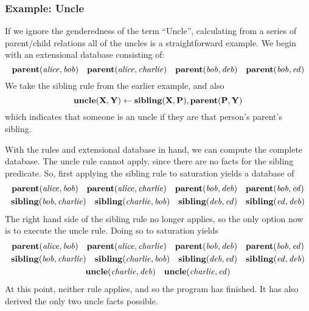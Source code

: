 \subsubsection{Example: Uncle}
If we ignore the genderedness of the term ``Uncle'', calculating from a series of parent/child relations all of the uncles is a straightforward example.
We begin with an extensional database consisting of:
\[
        {\bf parent}({\it alice}, {\it bob})
        \quad {\bf parent}({\it alice}, {\it charlie})
        \quad {\bf parent}({\it bob}, {\it deb})
        \quad {\bf parent}({\it bob}, {\it ed})
\]
We take the sibling rule from the earlier example, and also
\[
        {\bf uncle}({\bf X}, {\bf Y}) \leftarrow {\bf sibling}({\bf X}, {\bf P}), {\bf parent}({\bf P}, {\bf Y})
\]
which indicates that someone is an uncle if they are that person's parent's sibling.

With the rules and extensional database in hand, we can compute the complete database.
The uncle rule cannot apply, since there are no facts for the sibling predicate.
So, first applying the sibling rule to saturation yields a database of
\begin{gather*}
        {\bf parent}({\it alice}, {\it bob})
        \quad {\bf parent}({\it alice}, {\it charlie})
        \quad {\bf parent}({\it bob}, {\it deb})
        \quad {\bf parent}({\it bob}, {\it ed})\\
        {\bf sibling}({\it bob}, {\it charlie})
        \quad {\bf sibling}({\it charlie}, {\it bob})
        \quad {\bf sibling}({\it deb}, {\it ed})
        \quad {\bf sibling}({\it ed}, {\it deb})
\end{gather*}
The right hand side of the sibling rule no longer applies, so the only option now is to execute the uncle rule.
Doing so to saturation yields
\begin{gather*}
        {\bf parent}({\it alice}, {\it bob})
        \quad {\bf parent}({\it alice}, {\it charlie})
        \quad {\bf parent}({\it bob}, {\it deb})
        \quad {\bf parent}({\it bob}, {\it ed})\\
        {\bf sibling}({\it bob}, {\it charlie})
        \quad {\bf sibling}({\it charlie}, {\it bob})
        \quad {\bf sibling}({\it deb}, {\it ed})
        \quad {\bf sibling}({\it ed}, {\it deb})\\
        {\bf uncle}({\it charlie}, {\it deb})
        \quad {\bf uncle}({\it charlie}, {\it ed})
\end{gather*}
At this point, neither rule applies, and so the program has finished.
It has also derived the only two uncle facts possible.
